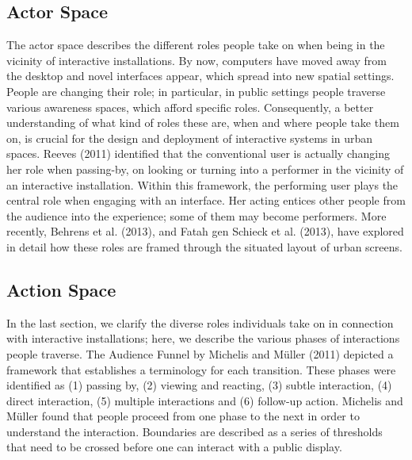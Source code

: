 \subsection* {Actor Space}
The actor space describes the different roles people take on when being in the vicinity of interactive installations. 
By now, computers have moved away from the desktop and novel interfaces appear, which spread into new spatial settings.
People are changing their role; in particular, in public settings people traverse various awareness spaces, which afford specific roles. 
Consequently, a better understanding of what kind of roles these are, when and where people take them on, is crucial for the design and deployment of interactive systems in urban spaces.
Reeves (2011) identified that the conventional user is actually changing her role when passing-by, on looking or turning into a performer in the vicinity of an interactive installation. 
Within this framework, the performing user plays the central role when engaging with an interface. 
Her acting entices other people from the audience into the experience; some of them may become performers. 
More recently, Behrens et al. (2013), and Fatah gen Schieck et al. (2013), have explored in detail how these roles are framed through the situated layout of urban screens.

\subsection* {Action Space}
In the last section, we clarify the diverse roles individuals take on in connection with interactive installations; here, we describe the various phases of interactions people traverse. 
The Audience Funnel by Michelis and Müller (2011) depicted a framework that establishes a terminology for each transition. 
These phases were identified as (1) passing by, (2) viewing and reacting, (3) subtle interaction, (4) direct interaction, (5) multiple interactions and (6) follow-up action. 
Michelis and Müller found that people proceed from one phase to the next in order to understand the interaction. 
Boundaries are described as a series of thresholds that need to be crossed before one can interact with a public display.

